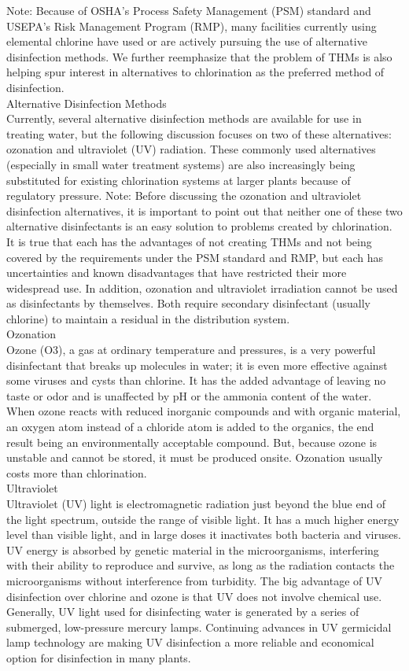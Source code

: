 Note: Because of OSHA’s Process Safety Management (PSM) standard and USEPA’s Risk Management Program (RMP), many facilities currently using elemental chlorine have used or are actively pursuing the use of alternative disinfection methods. We further reemphasize that the problem of THMs is also helping spur interest in alternatives to chlorination as the preferred method of disinfection.\\

Alternative Disinfection Methods\\
Currently, several alternative disinfection methods are available for use in treating water, but the following discussion focuses on two of these alternatives: ozonation and ultraviolet (UV) radiation. These commonly used alternatives (especially in small water treatment systems) are also increasingly being substituted for existing chlorination systems at larger plants because of regulatory pressure.
Note: Before discussing the ozonation and ultraviolet disinfection alternatives, it is important to point out that neither one of these two alternative disinfectants is an easy solution to problems created by chlorination. It is true that each has the advantages of not creating THMs and not being covered by the requirements under the PSM standard and RMP, but each has uncertainties and known disadvantages that have restricted their more widespread use. In addition, ozonation and ultraviolet irradiation cannot be used as disinfectants by themselves. Both require secondary disinfectant (usually chlorine) to maintain a residual in the distribution system.\\
Ozonation\\
Ozone (O3), a gas at ordinary temperature and pressures, is a very powerful disinfectant that breaks up molecules in water; it is even more effective against some viruses and cysts than chlorine. It has the added advantage of leaving no taste or odor and is unaffected by pH or the ammonia content of the water. When ozone reacts with reduced inorganic compounds and with organic material, an oxygen atom instead of a chloride atom is added to the organics, the end result being an environmentally acceptable compound. But, because ozone is unstable and cannot be stored, it must be produced onsite. Ozonation usually costs more than chlorination.\\
Ultraviolet\\
Ultraviolet (UV) light is electromagnetic radiation just beyond the blue end of the light spectrum, outside the range of visible light. It has a much higher energy level than visible light, and in large doses it inactivates both bacteria and viruses. UV energy is absorbed by genetic material in the microorganisms, interfering with their ability to reproduce and survive, as long as the radiation contacts the microorganisms without interference from turbidity. The big advantage of UV disinfection over chlorine and
ozone is that UV does not involve chemical use. Generally, UV light used for disinfecting water is generated by a series of submerged, low-pressure mercury lamps. Continuing advances in UV germicidal lamp technology are making UV disinfection a more reliable and economical option for disinfection in many plants.\\


